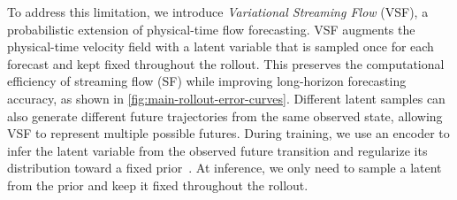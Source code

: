 To address this limitation, we introduce \emph{Variational Streaming Flow} (VSF), a probabilistic extension of physical-time flow forecasting. VSF augments the physical-time velocity field with a latent variable that is sampled once for each forecast and kept fixed throughout the rollout. This preserves the computational efficiency of streaming flow (SF) while improving long-horizon forecasting accuracy, as shown in \cref{fig:main-rollout-error-curves}. Different latent samples can also generate different future trajectories from the same observed state, allowing VSF to represent multiple possible futures.
%
During training, we use an encoder to infer the latent variable from the observed future transition and regularize its distribution toward a fixed prior~\citep{guo2025variational,eijkelboom2024variational}. At inference, we only need to sample a latent from the prior and keep it fixed throughout the rollout.




